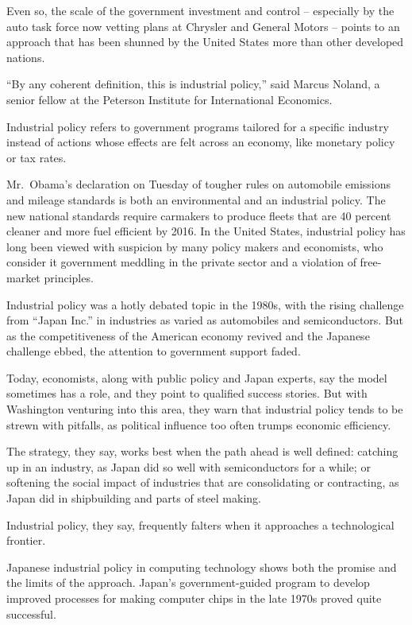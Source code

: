 \documentclass[12pt,a4paper,onecolumn]{article}
\begin{document}
Even so, the scale of the government investment and control -- especially by the auto task force now
vetting plans at Chrysler and General Motors -- points to an approach that has been shunned by the
United States more than other developed nations.

``By any coherent definition, this is industrial policy,'' said Marcus Noland, a senior fellow at
the Peterson Institute for International Economics.

Industrial policy refers to government programs tailored for a specific industry instead of actions
whose effects are felt across an economy, like monetary policy or tax rates.

Mr.~Obama's declaration on Tuesday of tougher rules on automobile emissions and mileage standards is
both an environmental and an industrial policy. The new national standards require carmakers to
produce fleets that are 40 percent cleaner and more fuel efficient by 2016. In the United States,
industrial policy has long been viewed with suspicion by many policy makers and economists, who
consider it government meddling in the private sector and a violation of free-market principles.

Industrial policy was a hotly debated topic in the 1980s, with the rising challenge from ``Japan
Inc.'' in industries as varied as automobiles and semiconductors. But as the competitiveness of the
American economy revived and the Japanese challenge ebbed, the attention to government support
faded.

Today, economists, along with public policy and Japan experts, say the model sometimes has a role,
and they point to qualified success stories. But with Washington venturing into this area, they warn
that industrial policy tends to be strewn with pitfalls, as political influence too often trumps
economic efficiency.

The strategy, they say, works best when the path ahead is well defined: catching up in an industry,
as Japan did so well with semiconductors for a while; or softening the social impact of industries
that are consolidating or contracting, as Japan did in shipbuilding and parts of steel making.

Industrial policy, they say, frequently falters when it approaches a technological frontier.

Japanese industrial policy in computing technology shows both the promise and the limits of the
approach. Japan's government-guided program to develop improved processes for making computer chips
in the late 1970s proved quite successful.
\end{document}
